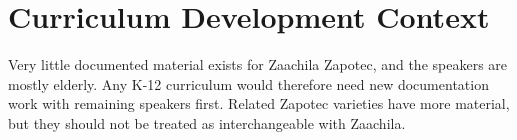\documentclass[12pt]{article}
\begin{document}
\section{Curriculum Development Context}
Very little documented material exists for Zaachila Zapotec, and the speakers are mostly elderly. Any K-12 curriculum would therefore need new documentation work with remaining speakers first. Related Zapotec varieties have more material, but they should not be treated as interchangeable with Zaachila.
\end{document}
